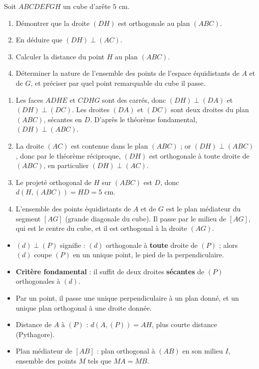 \documentclass[11pt]{article}
\begin{document}
\begin{exercice}
Soit $ABCDEFGH$ un cube d'arête $5$ cm.
\begin{enumerate}
  \item Démontrer que la droite $(DH)$ est orthogonale au plan $(ABC)$.
  \item En déduire que $(DH) \perp (AC)$.
  \item Calculer la distance du point $H$ au plan $(ABC)$.
  \item Déterminer la nature de l'ensemble des points de l'espace équidistants de $A$ et de $G$, et préciser par quel point remarquable du cube il passe.
\end{enumerate}
\end{exercice}

\begin{corrige}[Exercice]
\begin{enumerate}
  \item Les faces $ADHE$ et $CDHG$ sont des carrés, donc $(DH) \perp (DA)$ et $(DH) \perp (DC)$. Les droites $(DA)$ et $(DC)$ sont deux droites du plan $(ABC)$, sécantes en $D$. D'après le théorème fondamental, $(DH) \perp (ABC)$.
  \item La droite $(AC)$ est contenue dans le plan $(ABC)$ ; or $(DH) \perp (ABC)$, donc par le théorème réciproque, $(DH)$ est orthogonale à toute droite de $(ABC)$, en particulier $(DH) \perp (AC)$.
  \item Le projeté orthogonal de $H$ sur $(ABC)$ est $D$, donc $d(H, (ABC)) = HD = 5$ cm.
  \item L'ensemble des points équidistants de $A$ et de $G$ est le plan médiateur du segment $[AG]$ (grande diagonale du cube). Il passe par le milieu de $[AG]$, qui est le centre du cube, et il est orthogonal à la droite $(AG)$.
\end{enumerate}
\end{corrige}

\begin{aretenir}
\begin{itemize}
  \item $(d) \perp (P)$ signifie : $(d)$ orthogonale à \textbf{toute} droite de $(P)$ ; alors $(d)$ coupe $(P)$ en un unique point, le pied de la perpendiculaire.
  \item \textbf{Critère fondamental} : il suffit de deux droites \textbf{sécantes} de $(P)$ orthogonales à $(d)$.
  \item Par un point, il passe une unique perpendiculaire à un plan donné, et un unique plan orthogonal à une droite donnée.
  \item Distance de $A$ à $(P)$ : $d(A,(P)) = AH$, plus courte distance (Pythagore).
  \item Plan médiateur de $[AB]$ : plan orthogonal à $(AB)$ en son milieu $I$, ensemble des points $M$ tels que $MA = MB$.
\end{itemize}
\end{aretenir}
\end{document}
